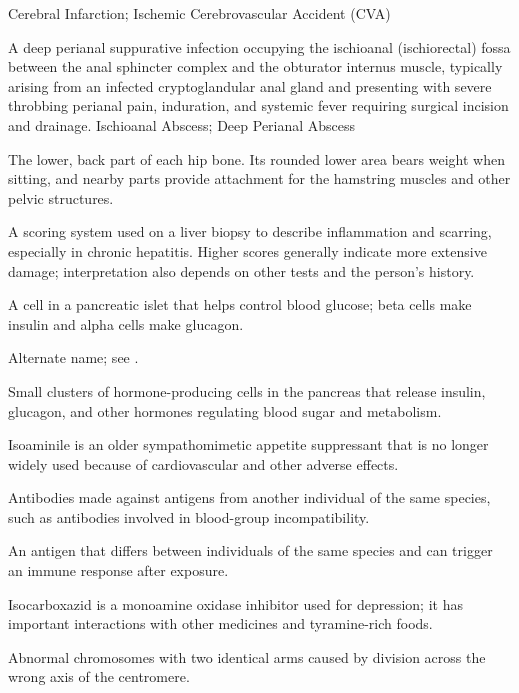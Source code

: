 \synonyms
Cerebral Infarction; Ischemic Cerebrovascular Accident (CVA)

 A deep perianal suppurative infection occupying the ischioanal (ischiorectal) fossa between the anal sphincter complex and the obturator internus muscle, typically arising from an infected cryptoglandular anal gland and presenting with severe throbbing perianal pain, induration, and systemic fever requiring surgical incision and drainage.
\synonyms
Ischioanal Abscess; Deep Perianal Abscess

 The lower, back part of each hip bone. Its rounded lower area bears weight when sitting, and nearby parts provide attachment for the hamstring muscles and other pelvic structures.

 A scoring system used on a liver biopsy to describe inflammation and scarring, especially in chronic hepatitis. Higher scores generally indicate more extensive damage; interpretation also depends on other tests and the person’s history.

 A cell in a pancreatic islet that helps control blood glucose; beta cells make insulin and alpha cells make glucagon.

 Alternate name; see .

 Small clusters of hormone-producing cells in the pancreas that release insulin, glucagon, and other hormones regulating blood sugar and metabolism.

 Isoaminile is an older sympathomimetic appetite suppressant that is no longer widely used because of cardiovascular and other adverse effects.

 Antibodies made against antigens from another individual of the same species, such as antibodies involved in blood-group incompatibility.

 An antigen that differs between individuals of the same species and can trigger an immune response after exposure.

 Isocarboxazid is a monoamine oxidase inhibitor used for depression; it has important interactions with other medicines and tyramine-rich foods.

 Abnormal chromosomes with two identical arms caused by division across the wrong axis of the centromere.

